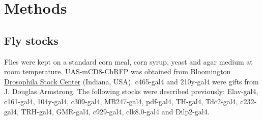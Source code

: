\section*{Methods}

\subsection*{Fly stocks}

Flies were kept on a standard corn meal, corn syrup, yeast and agar medium at room temperature.
\href{http://flystocks.bio.indiana.edu/Reports/27392.html}{UAS-mCD8-ChRFP} was obtained from \href{http://flystocks.bio.indiana.edu}{Bloomington Drosophila Stock Center} (Indiana, USA).
c465-gal4 and 210y-gal4 were gifts from J. Douglas Armstrong.
The following stocks were described previously: Elav-gal4\cite{Lin:1994vn}, c161-gal4\cite{renn:1999aa}, 104y-gal4\cite{sakai:2006aa}, c309-gal4\cite{connolly:1996aa}, MB247-gal4\cite{zars:2000aa}, pdf-gal4\cite{renn:1999ab}, TH-gal4\cite{friggi-grelin:2003aa}, Tdc2-gal4\cite{alekseyenko:2010aa}, c232-gal4\cite{renn:1999aa}, TRH-gal4\cite{alekseyenko:2010aa}, GMR-gal4\cite{freeman:1996aa}, c929-gal4\cite{taghert:2001aa}, clk8.0-gal4\cite{glossop:2003aa} and Dilp2-gal4\cite{Rulifson:2002cg}.
  
  